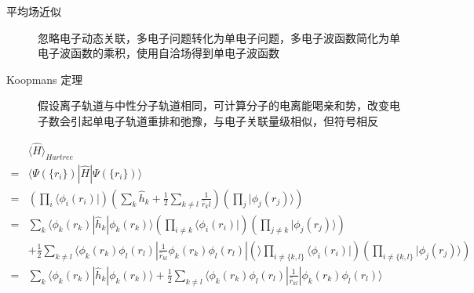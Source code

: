 \documentclass{article}
\numberwithin{equation}{section}
\newcommand{\bra}[1]{\langle #1 |}
\newcommand{\ket}[1]{| #1 \rangle}
\newcommand{\bracketl}[3]{\langle #1 | #2 | #3 \rangle}
\newcommand{\mean}[1]{\langle #1 \rangle}
\begin{document}
\begin{description}
	\item[平均场近似] 忽略电子动态关联，多电子问题转化为单电子问题，多电子波函数简化为单电子波函数的乘积，使用自洽场得到单电子波函数

	\item[Koopmans 定理]假设离子轨道与中性分子轨道相同，可计算分子的电离能喝亲和势，改变电子数会引起单电子轨道重排和弛豫，与电子关联量级相似，但符号相反
\end{description}
\begin{align*}
&\mean{\hat{H}}_{Hartree} \\
=& \bracketl{\Psi(\{r_i\})}{\hat{H}}{\Psi(\{r_i\})}\\
=&(\prod_i\bra{\phi_i(r_i)})(\sum_k\hat{h}_k+\frac{1}{2}\sum_{k\neq l}\frac{1}{\hat{r}_kl})(\prod_j\ket{\phi_j(r_j)})\\
=&\sum_k\bracketl{\phi_k(r_k)}{\hat{h}_k}{\phi_k(r_k)}(\prod_{i\neq k}\bra{\phi_i(r_i)})(\prod_{j \neq k}\ket{\phi_j(r_j)})\\
&+\frac{1}{2}\sum_{k \neq l}\bracketl{\phi_k(r_k)\phi_l(r_l)}{\frac{1}{\hat{r}_{kl}}\phi_k(r_k)\phi_l(r_l)}(\prod_{i \neq \{k,l\}}\bra{\phi_i(r_i)})(\prod_{i \neq \{k,l\}}\ket{\phi_j(r_j)})\\
=&\sum_k\bracketl{\phi_k(r_k)}{\hat{h}_k}{\phi_k(r_k)}+\frac{1}{2}\sum_{k \neq l}\bracketl{\phi_k(r_k)\phi_l(r_l)}{\frac{1}{\hat{r}_{kl}}}{\phi_k(r_k)\phi_l(r_l)}
\end{align*}
\end{document}
